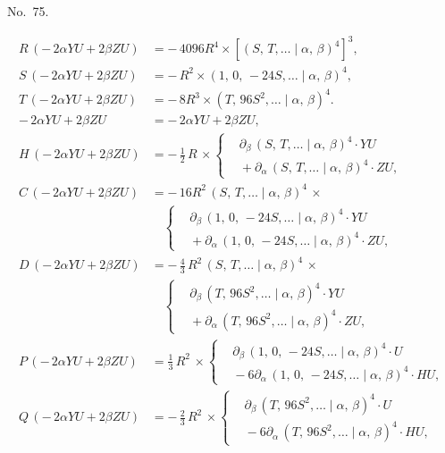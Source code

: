 \documentclass[11pt]{article}
\newcommand{\Cdel}{\mid}
\begin{document}
\begin{center}No.~75.\end{center}
\[
\begin{aligned}
   R\,(-\,2\alpha Y U + 2\beta Z U) &= -\,4096 R^4\times[(S,\,T,\ldots\Cdel\alpha,\,\beta)^4]^3,\\
   S\,(-\,2\alpha Y U + 2\beta Z U) &= -\,R^2\times(1,\,0,\,-24 S,\ldots\Cdel\alpha,\,\beta)^4,\\
   T\,(-\,2\alpha Y U + 2\beta Z U) &= -\,8 R^3\times(T,\,96 S^2,\ldots\Cdel\alpha,\,\beta)^4.\\[6pt]
   -\,2\alpha Y U + 2\beta Z U &= -\,2\alpha Y U + 2\beta Z U,\\
   H\,(-\,2\alpha Y U + 2\beta Z U) &= -\,\tfrac{1}{2}\,R\,\times\left\{\begin{aligned}&\partial_\beta\,(S,\,T,\ldots\Cdel\alpha,\,\beta)^4\cdot Y U\\ &{} + \partial_\alpha\,(S,\,T,\ldots\Cdel\alpha,\,\beta)^4\cdot Z U,\end{aligned}\right.\\
   C\,(-\,2\alpha Y U + 2\beta Z U) &= -\,16 R^2\,(S,\,T,\ldots\Cdel\alpha,\,\beta)^4\,\times\\
                                    &\quad\left\{\begin{aligned}&\partial_\beta\,(1,\,0,\,-24 S,\ldots\Cdel\alpha,\,\beta)^4\cdot Y U\\ &{} + \partial_\alpha\,(1,\,0,\,-24 S,\ldots\Cdel\alpha,\,\beta)^4\cdot Z U,\end{aligned}\right.\\
   D\,(-\,2\alpha Y U + 2\beta Z U) &= -\,\tfrac{4}{3}\,R^2\,(S,\,T,\ldots\Cdel\alpha,\,\beta)^4\,\times\\
                                    &\quad\left\{\begin{aligned}&\partial_\beta\,(T,\,96 S^2,\ldots\Cdel\alpha,\,\beta)^4\cdot Y U\\ &{} + \partial_\alpha\,(T,\,96 S^2,\ldots\Cdel\alpha,\,\beta)^4\cdot Z U,\end{aligned}\right.\\
   P\,(-\,2\alpha Y U + 2\beta Z U) &= \tfrac{1}{3}\,R^2\,\times\left\{\begin{aligned}&\partial_\beta\,(1,\,0,\,-24 S,\ldots\Cdel\alpha,\,\beta)^4\cdot U\\ &{} - 6\partial_\alpha\,(1,\,0,\,-24 S,\ldots\Cdel\alpha,\,\beta)^4\cdot H U,\end{aligned}\right.\\
   Q\,(-\,2\alpha Y U + 2\beta Z U) &= -\,\tfrac{2}{3}\,R^2\,\times\left\{\begin{aligned}&\partial_\beta\,(T,\,96 S^2,\ldots\Cdel\alpha,\,\beta)^4\cdot U\\ &{} - 6\partial_\alpha\,(T,\,96 S^2,\ldots\Cdel\alpha,\,\beta)^4\cdot H U,\end{aligned}\right.\\

\end{aligned}\]
\end{document}
